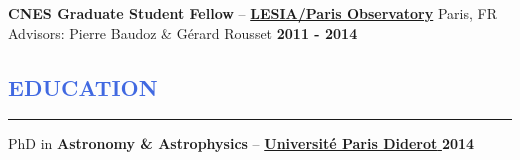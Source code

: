\documentclass[12pt]{article}
\begin{document}
\textbf{CNES Graduate Student Fellow} -- \href{http://www.obspm.fr/?lang=en}{\textbf{LESIA/Paris Observatory}} \hfill       {Paris, FR} \\
{\small Advisors: Pierre Baudoz \& Gérard Rousset }\hfill  	 { \bf 2011 - 2014}\\




%


\vspace{-0.3cm}
\textcolor{RoyalBlue}{\section{\large EDUCATION}
\vspace{-0.35cm}\hrule}
\vspace{0.4cm}

PhD in \textbf{Astronomy \& Astrophysics} -- \href{https://www.univ-paris-diderot.fr/}{\textbf{\textbf{Universit\'e Paris Diderot} }} \hfill  { \bf 2014}\\
\end{document}

